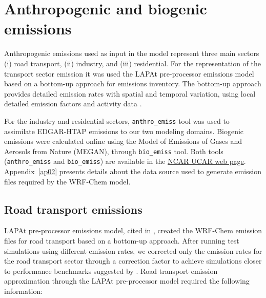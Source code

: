 	\section{Anthropogenic and biogenic emissions}
	Anthropogenic emissions used as input in the model represent three main sectors (i) road transport, (ii) industry, and (iii) residential.
	For the representation of the transport sector emission it was used the LAPAt pre-processor emissions model \citep{Andrade2015} based on a bottom-up approach for emissions inventory.
	The bottom-up approach provides detailed emission rates with spatial and temporal variation, using local detailed emission factors and activity data \citep{Wang2009}.
	
	For the industry and residential sectors, \verb|anthro_emiss| tool \citep{Kumar2020} was used to assimilate EDGAR-HTAP emissions to our two modeling domains.
	Biogenic emissions were calculated online using the Model of Emissions of Gases and Aerosols from Nature (MEGAN), through \verb|bio_emiss| tool.
	Both tools (\verb|anthro_emiss| and \verb|bio_emiss|) are available in the \href{https://www.acom.ucar.edu/wrf-chem/download.shtml}{NCAR UCAR web page}.
	Appendix~\ref{ap02} presents details about the data source used to generate emission files required by the WRF-Chem model.
	
		\subsection{Road transport emissions}
		LAPAt pre-processor emissions model, cited in \citet{Andrade2015}, created the WRF-Chem emission files for road transport based on a bottom-up approach.
		After running test simulations using different emission rates, we corrected only the emission rates for the road transport sector through a correction factor to achieve simulations closer to performance benchmarks suggested by \citet{Emery2017}.	
		Road transport emission approximation through the LAPAt pre-processor model required the following information:
		

